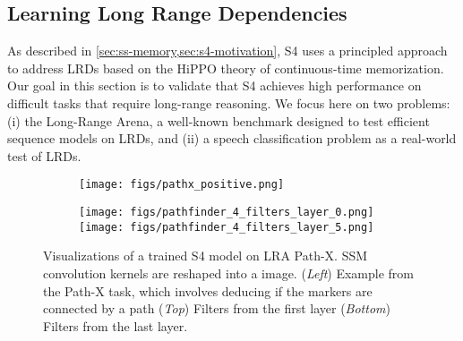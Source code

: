 \documentclass{article}
\newcommand{\methodabbrv}{S4}
\begin{document}
\subsection{Learning Long Range Dependencies}
\label{sec:experiments-lrd}
As described in \cref{sec:ss-memory,sec:s4-motivation}, \methodabbrv{} uses a principled approach to address LRDs based on the HiPPO theory of continuous-time memorization.
Our goal in this section is to validate that \methodabbrv{} achieves high performance on difficult tasks that require long-range reasoning.
We focus here on two problems:
(i) the Long-Range Arena, a well-known benchmark designed to test efficient sequence models on LRDs, and
(ii) a speech classification problem as a real-world test of LRDs.


\begin{figure}[t!]
  \centering
    \begin{subfigure}{0.3\linewidth}
        \centering
        \texttt{[image: figs/pathx\_positive.png]}
    \end{subfigure}\quad
    \begin{subfigure}{0.58\linewidth}
        \centering
        \lineskip=0pt
        \texttt{[image: figs/pathfinder\_4\_filters\_layer\_0.png]}\\
        \texttt{[image: figs/pathfinder\_4\_filters\_layer\_5.png]}
    \end{subfigure}
      \caption{
        Visualizations of a trained \methodabbrv{} model on LRA Path-X. SSM convolution kernels  are reshaped into a   image. (\textit{Left}) Example from the Path-X task, which involves deducing if the markers are connected by a path (\textit{Top}) Filters from the first layer (\textit{Bottom}) Filters from the last layer.
    }
  \label{fig:pathx-filters}
\end{figure}
\end{document}
